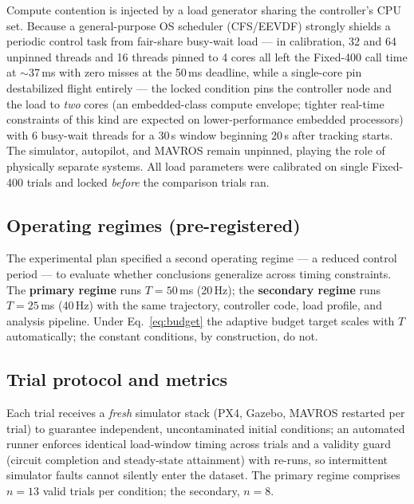 \documentclass[conference]{IEEEtran}
\begin{document}
Compute contention is injected by a load generator sharing the
controller's CPU set. Because a general-purpose OS scheduler (CFS/EEVDF)
strongly shields a periodic control task from fair-share busy-wait load
--- in calibration, 32 and 64 unpinned threads and 16 threads pinned to
4 cores all left the Fixed-400 call time at $\sim$37\,ms with zero misses
at the 50\,ms deadline, while a single-core pin destabilized flight
entirely --- the locked condition pins the controller node and the load
to \emph{two} cores (an embedded-class compute envelope; tighter
real-time constraints of this kind are expected on lower-performance
embedded processors) with 6 busy-wait threads for a 30\,s window
beginning 20\,s after tracking starts. The simulator, autopilot, and
MAVROS remain unpinned, playing the role of physically separate systems.
All load parameters were calibrated on single Fixed-400 trials and locked
\emph{before} the comparison trials ran.

\subsection{Operating regimes (pre-registered)}

The experimental plan specified a second operating regime --- a reduced
control period --- to evaluate whether conclusions generalize across
timing constraints. The \textbf{primary regime} runs $T = 50$\,ms
(20\,Hz); the \textbf{secondary regime} runs $T = 25$\,ms (40\,Hz) with
the same trajectory, controller code, load profile, and analysis
pipeline. Under Eq.~\eqref{eq:budget} the adaptive budget target scales
with $T$ automatically; the constant conditions, by construction, do not.

\subsection{Trial protocol and metrics}

Each trial receives a \emph{fresh} simulator stack (PX4, Gazebo, MAVROS
restarted per trial) to guarantee independent, uncontaminated initial
conditions; an automated runner enforces identical load-window timing
across trials and a validity guard (circuit completion and steady-state
attainment) with re-runs, so intermittent simulator faults cannot
silently enter the dataset. The primary regime comprises $n = 13$ valid
trials per condition; the secondary, $n = 8$.
\end{document}
